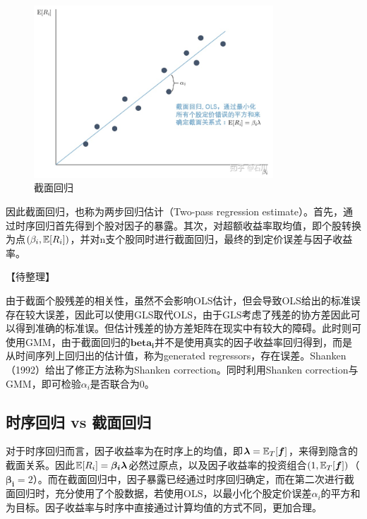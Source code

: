\documentclass[11pt]{article}
\begin{document}
\begin{figure}[H]
    \centering
    \includegraphics[width=0.8\textwidth]{fig/cs_reg.jpg}
    \caption{截面回归}
    \label{fig：cs_reg}
\end{figure}

因此截面回归，也称为两步回归估计（Two-pass regression estimate）。首先，通过时序回归首先得到个股对因子的暴露。其次，对超额收益率取均值，即个股转换为点$(\beta_i,\mathbb{E}[R_i])$，并对n支个股同时进行截面回归，最终的到定价误差与因子收益率。

【待整理】

由于截面个股残差的相关性，虽然不会影响OLS估计，但会导致OLS给出的标准误存在较大误差，因此可以使用GLS取代OLS，由于GLS考虑了残差的协方差因此可以得到准确的标准误。但估计残差的协方差矩阵在现实中有较大的障碍。此时则可使用GMM，由于截面回归的$\bm{beta_i}$并不是使用真实的因子收益率回归得到，而是从时间序列上回归出的估计值，称为generated regressors，存在误差。Shanken（1992）给出了修正方法称为Shanken correction。同时利用Shanken correction与GMM，即可检验$\alpha_i$是否联合为0。

\subsection{时序回归 vs 截面回归}

对于时序回归而言，因子收益率为在时序上的均值，即$\bm{\lambda} = \mathbb{E}_T[\bm{f}]$，来得到隐含的截面关系。因此$\mathbb{E}[R_i] = \bm{\beta_i \lambda}$必然过原点，以及因子收益率的投资组合$(1,\mathbb{E}_T[\bm{f}])$（$\bm{\beta_i}=2$）。而在截面回归中，因子暴露已经通过时序回归确定，而在第二次进行截面回归时，充分使用了个股数据，若使用OLS，以最小化个股定价误差$\alpha_i$的平方和为目标。因子收益率与时序中直接通过计算均值的方式不同，更加合理。
\end{document}
